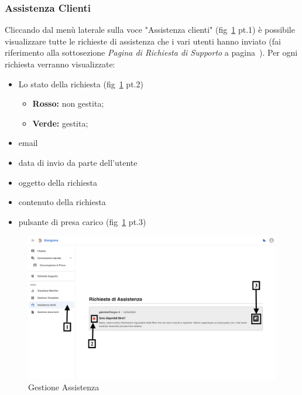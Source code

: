 \subsubsection{Assistenza Clienti}
Cliccando dal menù laterale sulla voce "Assistenza clienti" (fig~\ref{fig:Assistenza1} pt.1) è possibile visualizzare tutte le richieste di assistenza che i vari utenti hanno inviato (fai riferimento alla sottosezione \textit{Pagina di Richiesta di Supporto} a pagina~\pageref{fig:Pagina di Assistenza}).
Per ogni richiesta verranno visualizzate:
\begin{itemize}
    \item Lo stato della richiesta (fig~\ref{fig:Assistenza1} pt.2)
    \begin{itemize}
        \item \textbf{Rosso:} non gestita;
        \item \textbf{Verde:} gestita;
    \end{itemize}
    \item email
    \item data di invio da parte dell'utente %
    \item oggetto della richiesta %
    \item contenuto della richiesta %
    \item pulsante di presa carico (fig~\ref{fig:Assistenza1} pt.3)
\end{itemize}
\begin{figure}[h!]
    \centering
    \includegraphics[width=\textwidth]{./img/Assistenza1.png}
    \caption{Gestione Assistenza}
    \label{fig:Assistenza1}
\end{figure}
